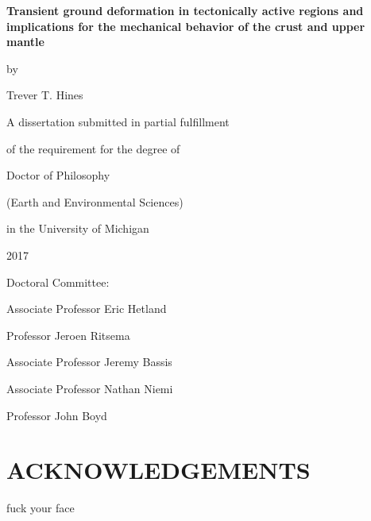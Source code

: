 \documentclass[letterpaper,12pt,oneside]{book}
\begin{document}
\frontmatter %

\begin{center}
\thispagestyle{empty} %
\vspace*{1.0in}
\textbf{\large{Transient ground deformation in tectonically active regions and implications for the mechanical behavior of the crust and upper mantle}}

\vspace*{0.25in}
by

\vspace*{0.25in}
Trever T. Hines 

\vspace*{2.0in}
A dissertation submitted in partial fulfillment

of the requirement for the degree of 

Doctor of Philosophy

(Earth and Environmental Sciences)

in the University of Michigan

2017
\end{center}
\vspace*{1.0in}
Doctoral Committee:

\vspace*{0.1in}
\hspace*{0.2in}
Associate Professor Eric Hetland

\hspace*{0.2in}
Professor Jeroen Ritsema

\hspace*{0.2in}
Associate Professor Jeremy Bassis

\hspace*{0.2in}
Associate Professor Nathan Niemi

\hspace*{0.2in}
Professor John Boyd

\newpage

\chapter*{ACKNOWLEDGEMENTS} 

fuck your face

\newpage

\tableofcontents
\listoffigures
\listoftables
\end{document}
